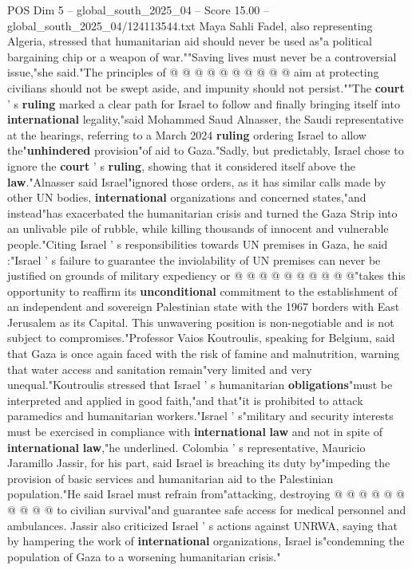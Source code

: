 \begin{textsample}{POS Dim 5 – global\_south\_2025\_04 – Score 15.00 – global\_south\_2025\_04/124113544.txt}
Maya Sahli Fadel, also representing Algeria, stressed that humanitarian aid should never be used as"a political bargaining chip or a weapon of war.""Saving lives must never be a controversial issue,"she said."The principles of @ @ @ @ @ @ @ @ @ @ aim at protecting civilians should not be swept aside, and impunity should not persist.""The \textbf{court} ' s \textbf{ruling} marked a clear path for Israel to follow and finally bringing itself into \textbf{international} legality,"said Mohammed Saud Alnasser, the Saudi representative at the hearings, referring to a March 2024 \textbf{ruling} ordering Israel to allow the"\textbf{unhindered} provision"of aid to Gaza."Sadly, but predictably, Israel chose to ignore the \textbf{court} ' s \textbf{ruling}, showing that it considered itself above the \textbf{law}."Alnasser said Israel"ignored those orders, as it has similar calls made by other UN bodies, \textbf{international} organizations and concerned states,"and instead"has exacerbated the humanitarian crisis and turned the Gaza Strip into an unlivable pile of rubble, while killing thousands of innocent and vulnerable people."Citing Israel ' s responsibilities towards UN premises in Gaza, he said :"Israel ' s failure to guarantee the inviolability of UN premises can never be justified on grounds of military expediency or @ @ @ @ @ @ @ @ @ @"takes this opportunity to reaffirm its \textbf{unconditional} commitment to the establishment of an independent and sovereign Palestinian state with the 1967 borders with East Jerusalem as its Capital.
This unwavering position is non-negotiable and is not subject to compromises."Professor Vaios Koutroulis, speaking for Belgium, said that Gaza is once again faced with the risk of famine and malnutrition, warning that water access and sanitation remain"very limited and very unequal."Koutroulis stressed that Israel ' s humanitarian \textbf{obligations}"must be interpreted and applied in good faith,"and that"it is prohibited to attack paramedics and humanitarian workers."Israel ' s"military and security interests must be exercised in compliance with \textbf{international} \textbf{law} and not in spite of \textbf{international} \textbf{law},"he underlined.
Colombia ' s representative, Mauricio Jaramillo Jassir, for his part, said Israel is breaching its duty by"impeding the provision of basic services and humanitarian aid to the Palestinian population."He said Israel must refrain from"attacking, destroying @ @ @ @ @ @ @ @ @ @ to civilian survival"and guarantee safe access for medical personnel and ambulances.
Jassir also criticized Israel ' s actions against UNRWA, saying that by hampering the work of \textbf{international} organizations, Israel is"condemning the population of Gaza to a worsening humanitarian crisis."

\end{textsample}
